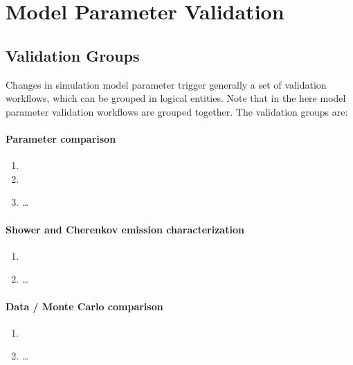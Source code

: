 \section{Model Parameter Validation}

\subsection{Validation Groups}

Changes in simulation model parameter trigger generally a set of validation workflows, which can be grouped in logical entities. 
Note that in the here  model parameter validation workflows are grouped together.
The validation groups are:

\paragraph{Parameter comparison} \label{validationGroup:ModelParameterComparison}
    \begin{enumerate}
        \item {}
        \item {}
        \item \dots
    \end{enumerate}
    
\paragraph{Shower and Cherenkov emission characterization} \label{validationGroup:ReferenceModelComparison}
    \begin{enumerate}
        \item {}
        \item \dots
    \end{enumerate}
    
\paragraph{Data / Monte Carlo comparison} \label{validationGroup:DataMonteCarloComparison}
    \begin{enumerate}
        \item {}
        \item \dots
    \end{enumerate}

